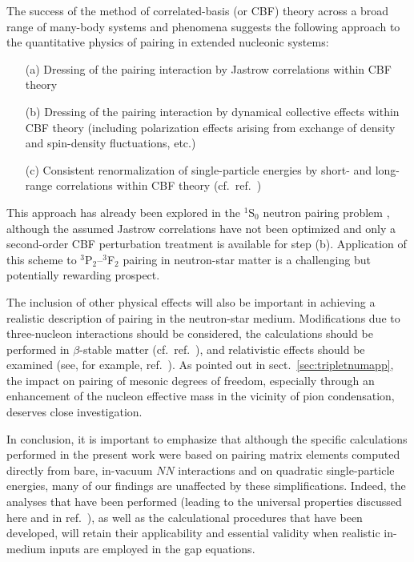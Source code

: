 The success of the method of correlated-basis (or CBF) theory across 
a broad range of many-body systems and phenomena \cite{bishop,ccdk} 
suggests the following approach to the quantitative physics of pairing in
extended nucleonic systems:
\begin{enumerate}
\item[(a)]
Dressing of the pairing interaction by Jastrow correlations within 
CBF theory \cite{kroclark,ksj}
\item[(b)]
Dressing of the pairing interaction by dynamical collective effects
within CBF theory \cite{ksj,chen} (including polarization effects 
arising from exchange of density and spin-density fluctuations, etc.) 
\item[(c)]
Consistent renormalization of single-particle energies by short-
and long-range correlations within CBF theory (cf.\ ref.~\cite{kcj})
\end{enumerate}
This approach has already been explored in the $^1$S$_0$ neutron pairing
problem \cite{chen,ccdk}, although the assumed Jastrow correlations
have not been optimized and only a second-order CBF perturbation
treatment is available for step (b).  Application of this scheme 
to $^3$P$_2$--$^3$F$_2$ pairing in neutron-star matter is 
a challenging but potentially rewarding prospect.  

The inclusion of other physical effects will also be important in
achieving a realistic description of pairing in the neutron-star
medium.  Modifications due to three-nucleon interactions should
be considered, the calculations should be performed in $\beta$-stable
matter (cf.\ ref.~\cite{elgaroy}), and relativistic effects should 
be examined (see, for example, ref.~\cite{elgaroyrel1,elgaroyrel2}).
As pointed out in sect.~\ref{sec:tripletnumapp}, the impact on
pairing of mesonic degrees of freedom, especially through an
enhancement of the nucleon effective mass in the vicinity of
pion condensation, deserves close investigation.

In conclusion, it is important to emphasize that although the specific 
calculations performed in the present work were based on pairing matrix 
elements computed directly from bare, in-vacuum $NN$ interactions and 
on quadratic single-particle energies, many of our findings
are unaffected by these simplifications.  Indeed, the analyses that 
have been performed (leading to the universal properties discussed 
here and in ref.~\cite{univ}), as well as the calculational procedures 
that have been developed, will retain their applicability and 
essential validity when realistic in-medium inputs are employed in 
the gap equations.  

